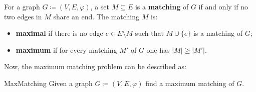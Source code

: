 \begin{definition}[Matching]
	\label{def:matching}
	For a graph \(G \coloneqq (V, E, \varphi)\), a set \(M \subseteq E\) is a \textbf{matching} of \(G\) if and only if no two edges in \(M\) share an end.
	The matching \(M\) is:
	\begin{itemize}
		\item 
			\textbf{maximal} if there is no edge \(e \in E \setminus M\) such that \(M \cup \{e\}\) is a matching of \(G\);
		\item
			\textbf{maximum} if for every matching \(M'\) of \(G\) one has \(|M| \geq |M'|\).
	\end{itemize}
\end{definition}

\noindent
Now, the maximum matching problem can be described as:
\\
\begin{problem}{MaxMatching}
	\label{prob:maxmatching}
	Given a graph \(G \coloneqq (V, E, \varphi)\) find a maximum matching of \(G\).
\end{problem}

